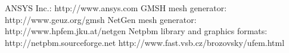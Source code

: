 
\begin{thebibliography}{999}
 ANSYS Inc.: http://www.ansys.com
 GMSH mesh generator: http://www.geuz.org/gmsh
 NetGen mesh generator: http://www.hpfem.jku.at/netgen
 Netpbm library and graphics formats: http://netpbm.sourceforge.net
 http://www.fast.vsb.cz/brozovsky/ufem.html
\end{thebibliography}
